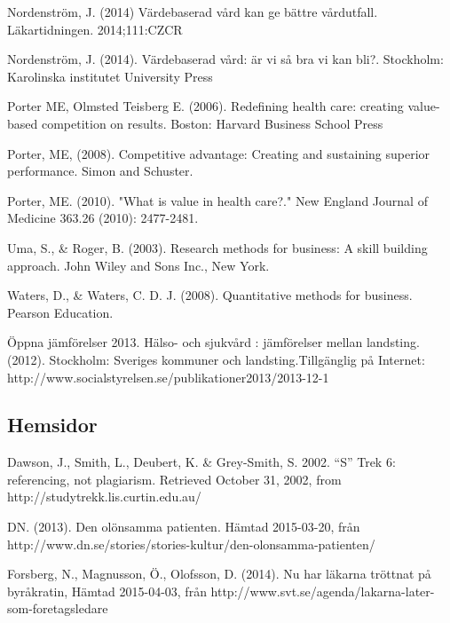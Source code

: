 Nordenström, J. (2014) Värdebaserad vård kan ge bättre vårdutfall.  Läkartidningen. 2014;111:CZCR\newline

Nordenström, J. (2014). Värdebaserad vård: är vi så bra vi kan bli?. Stockholm: Karolinska institutet University Press\newline

Porter ME, Olmsted Teisberg E. (2006). Redefining health care: creating value-based competition on results. Boston: Harvard Business School Press\newline

Porter, ME, (2008). Competitive advantage: Creating and sustaining superior performance. Simon and Schuster. \newline

Porter, ME. (2010). "What is value in health care?." New England Journal of Medicine 363.26 (2010): 2477-2481.\newline

Uma, S., \& Roger, B. (2003). Research methods for business: A skill building approach. John Wiley and Sons Inc., New York.\newline

Waters, D., \& Waters, C. D. J. (2008). Quantitative methods for business. Pearson Education.\newline

Öppna jämförelser 2013. Hälso- och sjukvård : jämförelser mellan landsting. (2012). Stockholm: Sveriges kommuner och landsting.Tillgänglig på Internet: http://www.socialstyrelsen.se/publikationer2013/2013-12-1\newline

\subsection{Hemsidor}		 	 	 							

Dawson, J., Smith, L., Deubert, K. \& Grey-Smith, S. 2002. “S” Trek 6: referencing, not plagiarism. Retrieved October 31, 2002, from http://studytrekk.lis.curtin.edu.au/ \newline

DN. (2013). Den olönsamma patienten. Hämtad 2015-03-20, från http://www.dn.se/stories/stories-kultur/den-olonsamma-patienten/\newline

Forsberg, N., Magnusson, Ö., Olofsson, D. (2014). Nu har läkarna tröttnat på byråkratin, Hämtad 2015-04-03, från http://www.svt.se/agenda/lakarna-later-som-foretagsledare\newline
			

